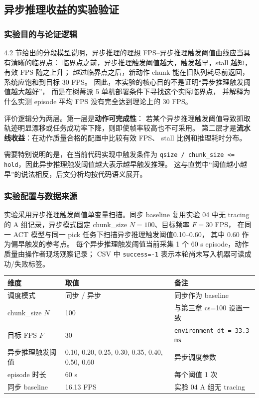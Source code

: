 \subsection{异步推理收益的实验验证}\label{sec:async-exp}

\subsubsection{实验目的与论证逻辑}\label{sec:async-exp-purpose}

4.2 节给出的分段模型说明，异步推理的理想 FPS--异步推理触发阈值曲线应当具有清晰的临界点：
临界点之前，异步推理触发阈值越大，触发越早，stall 越短，有效 FPS 随之上升；
越过临界点之后，新动作 chunk 能在旧队列耗尽前返回，系统应饱和到目标 30 FPS。
因此，本实验的核心目的不是证明``异步推理触发阈值越大越好''，
而是在树莓派 5 单机部署条件下寻找这个实际临界点，
并解释为什么实测 episode 平均 FPS 没有完全达到理论上的 30 FPS。

评价逻辑分为两层。第一层是\textbf{动作可完成性}：
若某个异步推理触发阈值导致抓取轨迹明显漂移或任务成功率下降，则即使帧率较高也不可采用。
第二层才是\textbf{流水线收益}：在动作质量合格的配置中比较有效 FPS、
stall 比例和推理耗时分布。

需要特别说明的是，在当前代码实现中触发条件为
\texttt{qsize / chunk\_size <= hold}，因此异步推理触发阈值越大表示越早触发推理。
这与直觉中``阈值越小越早''的说法相反，后文分析均按代码语义展开。

\subsubsection{实验配置与数据来源}\label{sec:async-exp-design}

实验采用异步推理触发阈值单变量扫描。同步 baseline 复用实验 04 中无 tracing 的
A 组记录，异步模式固定 chunk\_size $N=100$、目标频率 $F=30$ FPS，
在同一 ACT 模型与同一 pick 任务下扫描异步推理触发阈值0.10--0.60，
其中 0.60 作为偏早触发的参考点。
每个异步推理触发阈值当前采集 1 个 60 s episode，动作质量由操作者现场观察记录；
CSV 中 \texttt{success=-1} 表示本轮尚未写入机器可读成功/失败标签。

\begin{center}
\begin{tabular}{lll}
  \toprule
  维度 & 取值 & 备注 \\
  \midrule
  调度模式 & 同步 / 异步 & 同步作为 baseline \\
  chunk\_size $N$ & 100 & 与第三章 cs=100 设置一致 \\
  目标 FPS $F$ & 30 & \texttt{environment\_dt = 33.3 ms} \\
  异步推理触发阈值 & 0.10, 0.20, 0.25, 0.30, 0.35, 0.40, 0.50, 0.60 & 异步调度参数 \\
  episode 时长 & 60 s & 每个阈值 1 次 \\
  同步 baseline & 16.13 FPS & 实验 04 A 组无 tracing \\
  \bottomrule
\end{tabular}
\end{center}

